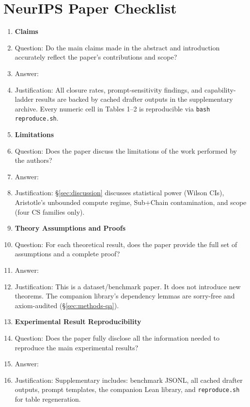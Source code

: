 \section*{NeurIPS Paper Checklist}

\begin{enumerate}

\item {\bf Claims}
    \item[] Question: Do the main claims made in the abstract and introduction accurately reflect the paper's contributions and scope?
    \item[] Answer: \answerYes{}
    \item[] Justification: All closure rates, prompt-sensitivity findings, and capability-ladder results are backed by cached drafter outputs in the supplementary archive. Every numeric cell in Tables 1--2 is reproducible via \texttt{bash reproduce.sh}.

\item {\bf Limitations}
    \item[] Question: Does the paper discuss the limitations of the work performed by the authors?
    \item[] Answer: \answerYes{}
    \item[] Justification: \S\ref{sec:discussion} discusses statistical power (Wilson CIs), Aristotle's unbounded compute regime, Sub+Chain contamination, and scope (four CS families only).

\item {\bf Theory Assumptions and Proofs}
    \item[] Question: For each theoretical result, does the paper provide the full set of assumptions and a complete proof?
    \item[] Answer: \answerNA{}
    \item[] Justification: This is a dataset/benchmark paper. It does not introduce new theorems. The companion library's dependency lemmas are sorry-free and axiom-audited (\S\ref{sec:methods-qa}).

\item {\bf Experimental Result Reproducibility}
    \item[] Question: Does the paper fully disclose all the information needed to reproduce the main experimental results?
    \item[] Answer: \answerYes{}
    \item[] Justification: Supplementary includes: benchmark JSONL, all cached drafter outputs, prompt templates, the companion Lean library, and \texttt{reproduce.sh} for table regeneration.


\end{enumerate}
